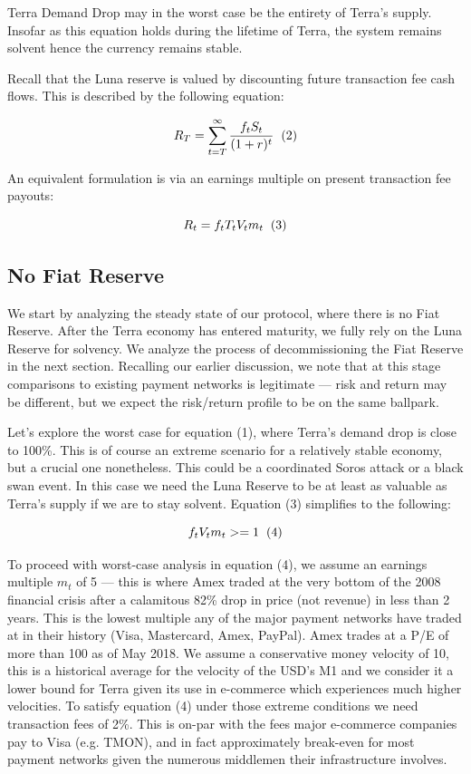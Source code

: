 \documentclass{article}
\begin{document}
Terra Demand Drop may in the worst case be the entirety of Terra's supply. Insofar as this equation holds during the lifetime of Terra, the system remains solvent hence the currency remains stable.

Recall that the Luna reserve is valued by discounting future transaction fee cash flows. This is described by the following equation: 

$$R_T = \sum_{t=T}^{\infty}\frac{f_tS_t}{(1+r)^t} \hspace{0.2cm} (2)$$ \newline

An equivalent formulation is via an earnings multiple on present transaction fee payouts:

 $$R_t = f_tT_tV_tm_t \hspace{0.2cm} (3)$$

\subsection{No Fiat Reserve}

We start by analyzing the steady state of our protocol, where there is no Fiat Reserve. After the Terra economy has entered maturity, we fully rely on the Luna Reserve for solvency. We analyze the process of decommissioning the Fiat Reserve in the next section. Recalling our earlier discussion, we note that at this stage comparisons to existing payment networks is legitimate — risk and return may be different, but we expect the risk/return profile to be on the same ballpark.

Let's explore the worst case for equation (1), where Terra's demand drop is close to 100\%. This is of course an extreme scenario for a relatively stable economy, but a crucial one nonetheless. This could be a coordinated Soros attack or a black swan event. In this case we need the Luna Reserve to be at least as valuable as Terra's supply if we are to stay solvent. Equation (3) simplifies to the following:

$$f_tV_tm_t >= 1 \hspace{0.2cm} (4)$$

To proceed with worst-case analysis in equation (4), we assume an earnings multiple $m_t$ of 5 — this is where Amex traded at the very bottom of the 2008 financial crisis after a calamitous 82\% drop in price (not revenue) in less than 2 years. This is the lowest multiple any of the major payment networks have traded at in their history (Visa, Mastercard, Amex, PayPal). Amex trades at a P/E of more than 100 as of May 2018. We assume a conservative money velocity of 10, this is a historical average for the velocity of the USD's M1 and we consider it a lower bound for Terra given its use in e-commerce which experiences much higher velocities. To satisfy equation (4) under those extreme conditions we need transaction fees of 2\%. This is on-par with the fees major e-commerce companies pay to Visa (e.g. TMON), and in fact approximately break-even for most payment networks given the numerous middlemen their infrastructure involves. 
\end{document}
